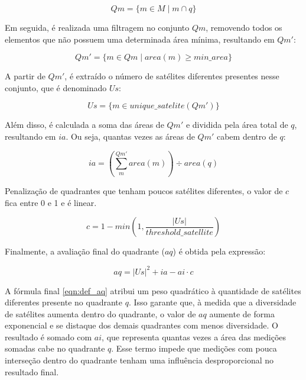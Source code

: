 \documentclass[cic,tc]{iiufrgs}
\begin{document}
\begin{equation} \label{eqn:def_qm}
Qm = \{ m \in M \mid m \cap q \}
\end{equation}

Em seguida, é realizada uma filtragem no conjunto $Qm$, removendo todos os elementos que não possuem uma determinada área mínima, resultando em $Qm'$: \par

\begin{equation} \label{eqn:def_qm_line}
Qm' = \{ m \in Qm \mid area\left(m\right) \ge min\_area \}
\end{equation}

A partir de $Qm'$, é extraído o número de satélites diferentes presentes nesse conjunto, que é denominado $Us$: \par

\begin{equation} \label{eqn:def_us}
Us = \{ m \in unique\_satelite\left(Qm'\right) \}
\end{equation}

Além disso, é calculada a soma das áreas de $Qm'$ e dividida pela área total de $q$, resultando em $ia$. Ou seja, quantas vezes as áreas de $Qm'$ cabem dentro de $q$: \par

\begin{equation} \label{eqn:def_ia}
ia = \left(\sum_{m}^{Qm'} area\left(m\right)\right) \div area(q)
\end{equation}

Penalização de quadrantes que tenham poucos satélites diferentes, o valor de $c$ fica entre 0 e 1 e é linear. \par

\begin{equation} \label{eqn:def_c}
c = 1 - min\left(1, \frac{|Us|}{threshold\_satellite}\right)
\end{equation}

Finalmente, a avaliação final do quadrante ($aq$) é obtida pela expressão: \par

\begin{equation} \label{eqn:def_aq}
aq = |Us|^2 + ia - ai \cdot c
\end{equation}

A fórmula final \ref{eqn:def_aq} atribui um peso quadrático à quantidade de satélites diferentes presente no quadrante $q$. Isso garante que, à medida que a diversidade de satélites aumenta dentro do quadrante, o valor de $aq$ aumente de forma exponencial e se distaque dos demais quadrantes com menos diversidade. O resultado é somado com $ai$, que representa quantas vezes a área das medições somadas cabe no quadrante $q$. Esse termo impede que medições com pouca interseção dentro do quadrante tenham uma influência desproporcional no resultado final. \par
\end{document}
